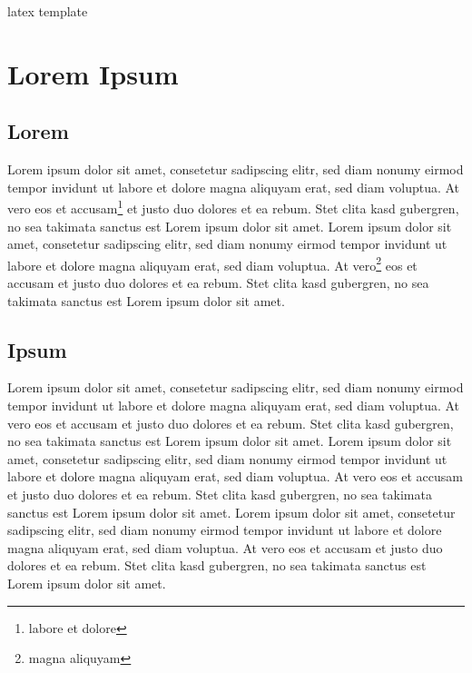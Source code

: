 \documentclass[12pt]{scrartcl}
\begin{document}
\begin{titlepage}

    \begin{center}

        latex template

    \end{center}

\end{titlepage}

\tableofcontents
{}

\newpage

\listoffigures
{}

\newpage

\listoftables
{}

\newpage

\section{Lorem Ipsum}

\subsection{Lorem}

Lorem ipsum dolor sit amet, consetetur sadipscing elitr, sed diam nonumy eirmod
tempor invidunt ut labore et dolore magna aliquyam erat, sed diam voluptua. At
vero eos et accusam\footnote{labore et dolore} et justo duo dolores et ea
rebum. Stet clita kasd gubergren, no sea takimata sanctus est Lorem ipsum dolor
sit amet. Lorem ipsum dolor sit amet, consetetur sadipscing elitr, sed diam
nonumy eirmod tempor invidunt ut labore et dolore magna aliquyam erat, sed diam
voluptua. At vero\footnote{magna aliquyam} eos et accusam et justo duo dolores
et ea rebum. Stet clita kasd gubergren, no sea takimata sanctus est Lorem ipsum
dolor sit amet.

\subsection{Ipsum}

Lorem ipsum dolor sit amet, consetetur sadipscing elitr, sed diam nonumy eirmod
tempor invidunt ut labore et dolore magna aliquyam erat, sed diam voluptua. At
vero eos et accusam et justo duo dolores et ea rebum. Stet clita kasd
gubergren, no sea takimata sanctus est Lorem ipsum dolor sit amet. Lorem ipsum
dolor sit amet, consetetur sadipscing elitr, sed diam nonumy eirmod tempor
invidunt ut labore et dolore magna aliquyam erat, sed diam voluptua. At vero
eos et accusam et justo duo dolores et ea rebum. Stet clita kasd gubergren, no
sea takimata sanctus est Lorem ipsum dolor sit amet. Lorem ipsum dolor sit
amet, consetetur sadipscing elitr, sed diam nonumy eirmod tempor invidunt ut
labore et dolore magna aliquyam erat, sed diam voluptua. At vero eos et accusam
et justo duo dolores et ea rebum. Stet clita kasd gubergren, no sea takimata
sanctus est Lorem ipsum dolor sit amet.
\end{document}
